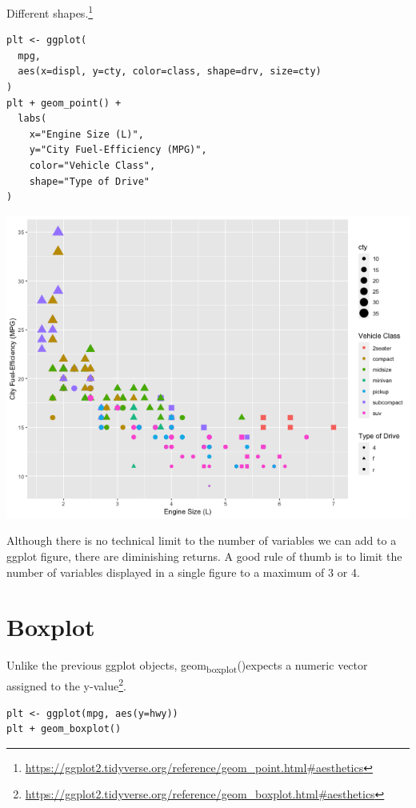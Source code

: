 \documentclass[11pt]{article}
\begin{document}
Different shapes.\footnote{\url{https://ggplot2.tidyverse.org/reference/geom\_point.html\#aesthetics}}

\begin{verbatim}
plt <- ggplot(
  mpg,
  aes(x=displ, y=cty, color=class, shape=drv, size=cty)
)
plt + geom_point() +
  labs(
    x="Engine Size (L)",
    y="City Fuel-Efficiency (MPG)",
    color="Vehicle Class",
    shape="Type of Drive"
)
\end{verbatim}

\begin{org}
\begin{center}
\includegraphics[width=.9\linewidth]{./resources/mpg_dots3.png}
\end{center}
\end{org}

Although there is no technical limit to the number of variables we can add to a ggplot figure, there are diminishing returns. A good rule of thumb is to limit the number of variables displayed in a single figure to a maximum of 3 or 4.

\section{Boxplot}
\label{sec:org05e5add}

Unlike the previous ggplot objects, geom\textsubscript{boxplot}()expects a numeric vector assigned to the y-value\footnote{\url{https://ggplot2.tidyverse.org/reference/geom\_boxplot.html\#aesthetics}}.

\begin{verbatim}
plt <- ggplot(mpg, aes(y=hwy))
plt + geom_boxplot()
\end{verbatim}
\end{document}
